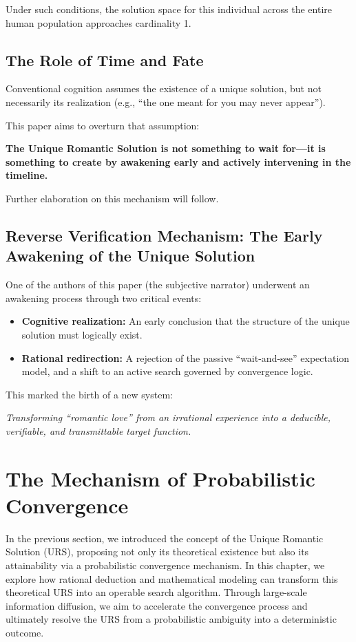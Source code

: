 \documentclass[12pt]{article}
\begin{document}
Under such conditions, the solution space for this individual across the entire human population approaches cardinality 1.

\subsection{The Role of Time and Fate}

Conventional cognition assumes the existence of a unique solution, but not necessarily its realization (e.g., ``the one meant for you may never appear'').

This paper aims to overturn that assumption:

\textbf{The Unique Romantic Solution is not something to wait for—it is something to create by awakening early and actively intervening in the timeline.}

Further elaboration on this mechanism will follow.

\subsection{Reverse Verification Mechanism: The Early Awakening of the Unique Solution}

One of the authors of this paper (the subjective narrator) underwent an awakening process through two critical events:

\begin{itemize}
  \item \textbf{Cognitive realization:} An early conclusion that the structure of the unique solution must logically exist.
  \item \textbf{Rational redirection:} A rejection of the passive ``wait-and-see'' expectation model, and a shift to an active search governed by convergence logic.
\end{itemize}

This marked the birth of a new system:

\textit{Transforming ``romantic love'' from an irrational experience into a deducible, verifiable, and transmittable target function.}

\section{The Mechanism of Probabilistic Convergence}

In the previous section, we introduced the concept of the Unique Romantic Solution (URS), proposing not only its theoretical existence but also its attainability via a probabilistic convergence mechanism. In this chapter, we explore how rational deduction and mathematical modeling can transform this theoretical URS into an operable search algorithm. Through large-scale information diffusion, we aim to accelerate the convergence process and ultimately resolve the URS from a probabilistic ambiguity into a deterministic outcome.
\end{document}
